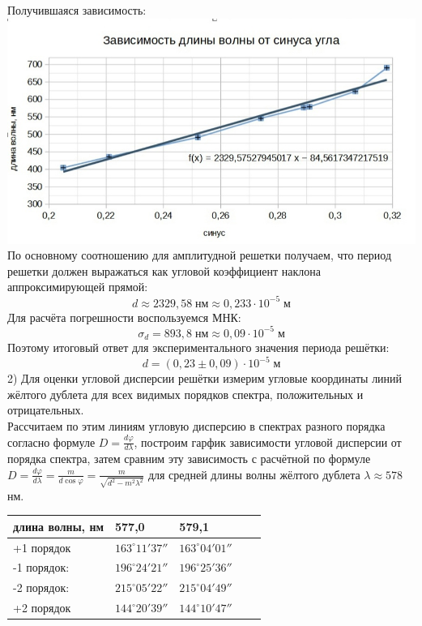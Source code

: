 \documentclass[a4paper]{article}
\begin{document}
Получившаяся зависимость:\\
\includegraphics[width=18cm]{g1}\\
По основному соотношению для амплитудной решетки получаем, что период решетки должен выражаться как угловой коэффициент наклона аппроксимирующей прямой:\\
$$d \approx 2329,58\; \textit{нм} \approx 0,233 \cdot 10^{-5}\; \textit{м}$$
Для расчёта погрешности воспользуемся МНК:\\
$$\sigma_d = 893,8 \; \textit{нм} \approx 0,09\cdot 10^{-5} \; \textit{м}$$
Поэтому итоговый ответ для экспериментального значения периода решётки:
$$ d = (0,23 \pm 0,09) \cdot 10^{-5} \; \textit{м}$$ 
2) Для оценки угловой дисперсии решётки измерим угловые координаты линий жёлтого дублета для всех видимых порядков спектра, положительных и отрицательных.\\
Рассчитаем по этим линиям угловую дисперсию в спектрах разного порядка согласно формуле $D = \frac{d\varphi}{d\lambda}$, построим гарфик зависимости угловой дисперсии от порядка спектра, затем сравним эту зависимость с расчётной по формуле  $D = \frac{d\varphi}{d\lambda} = \frac{m}{d \cos \varphi}=\frac{m}{\sqrt{d^{2}-m^{2} \lambda^{2}}}$ для средней длины волны жёлтого дублета $\lambda \approx 578$ нм.\\
\begin{center}
\begin{tabular}{|l|l|l|l|l|}
\hline
длина волны, нм & 577,0 & 579,1\\
\hline
+1 порядок  & $163^{\circ} 11' 37''$ & $163^{\circ} 04' 01''$   \\
\hline
-1 порядок: & $196^{\circ} 24' 21''$ & $196^{\circ} 25' 36''$   \\
\hline
-2 порядок: & $215^{\circ} 05' 22''$ & $215^{\circ} 04' 49''$   \\
\hline
+2 порядок  & $144^{\circ} 20' 39''$ & $144^{\circ} 10' 47''$  \\ 
\hline
\end{tabular}
\end{center}
\end{document}
